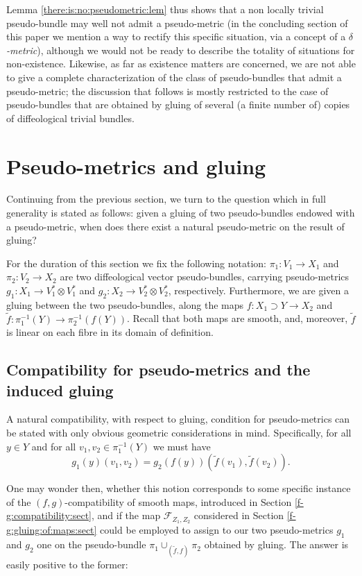 \documentclass{article}
\begin{document}
Lemma \ref{there:is:no:pseudometric:lem} thus shows that a non locally trivial pseudo-bundle may well not admit a pseudo-metric (in the concluding section of this paper we mention a way to rectify this 
specific situation, via a concept of a \emph{$\delta$-metric}), although we would not be ready to describe the totality of situations for non-existence. Likewise, as far as existence matters are concerned, we 
are not able to give a complete characterization of the class of pseudo-bundles that admit a pseudo-metric; the discussion that follows is mostly restricted to the case of pseudo-bundles that are obtained by 
gluing of several (a finite number of) copies of diffeological trivial bundles.



\section{Pseudo-metrics and gluing}

Continuing from the previous section, we turn to the question which in full generality is stated as follows: given a gluing of two pseudo-bundles endowed with a pseudo-metric, when does there exist a
natural pseudo-metric on the result of gluing?

For the duration of this section we fix the following notation: $\pi_1:V_1\to X_1$ and $\pi_2:V_2\to X_2$ are two diffeological vector pseudo-bundles, carrying pseudo-metrics $g_1:X_1\to V_1^*\otimes V_1^*$ 
and $g_2:X_2\to V_2^*\otimes V_2^*$, respectively. Furthermore, we are given a gluing between the two pseudo-bundles, along the maps $f:X_1\supset Y\to X_2$ and $\tilde{f}:\pi_1^{-1}(Y)\to\pi_2^{-1}(f(Y))$. 
Recall that both maps are smooth, and, moreover, $\tilde{f}$ is linear on each fibre in its domain of definition.


\subsection{Compatibility for pseudo-metrics and the induced gluing}

A natural compatibility, with respect to gluing, condition for pseudo-metrics can be stated with only obvious geometric considerations in mind. Specifically, for all $y\in Y$ and for all $v_1,v_2\in\pi_1^{-1}(Y)$ 
we must have
$$g_1(y)(v_1,v_2)=g_2(f(y))(\tilde{f}(v_1),\tilde{f}(v_2)).$$

One may wonder then, whether this notion corresponds to some specific instance of the $(f,g)$-compatibility of smooth maps, introduced in Section \ref{f-g:compatibility:sect}, and if the map 
$\mathcal{F}_{Z_1,Z_2}$ considered in Section \ref{f-g:gluing:of:maps:sect} could be employed to assign to our two pseudo-metrics $g_1$ and $g_2$ one on the pseudo-bundle $\pi_1\cup_{(\tilde{f},f)}\pi_2$ 
obtained by gluing. The answer is easily positive to the former:
\end{document}
